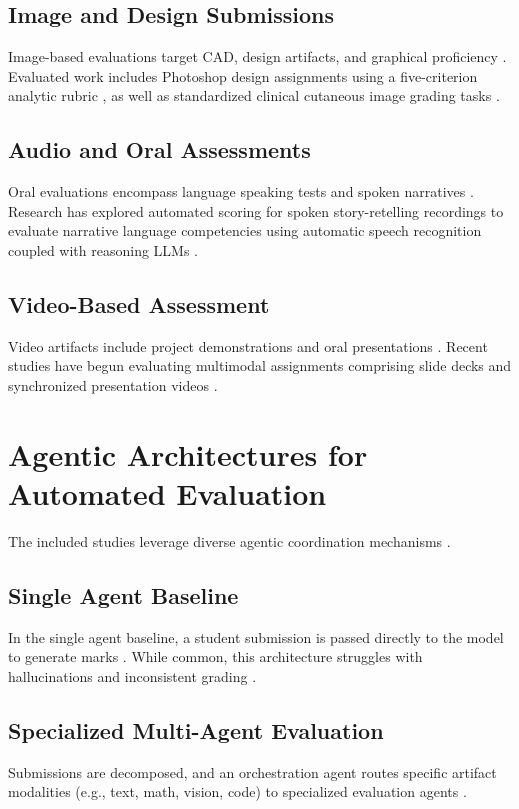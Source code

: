 \documentclass[11pt,a4paper]{article}
\begin{document}
\subsection{Image and Design Submissions}
Image-based evaluations target CAD, design artifacts, and graphical proficiency \cite{P006, P014}. Evaluated work includes Photoshop design assignments using a five-criterion analytic rubric \cite{P014}, as well as standardized clinical cutaneous image grading tasks \cite{P006}.

\subsection{Audio and Oral Assessments}
Oral evaluations encompass language speaking tests and spoken narratives \cite{P029}. Research has explored automated scoring for spoken story-retelling recordings to evaluate narrative language competencies using automatic speech recognition coupled with reasoning LLMs \cite{P029}.

\subsection{Video-Based Assessment}
Video artifacts include project demonstrations and oral presentations \cite{P020}. Recent studies have begun evaluating multimodal assignments comprising slide decks and synchronized presentation videos \cite{P020}.

\section{Agentic Architectures for Automated Evaluation}
The included studies leverage diverse agentic coordination mechanisms \cite{P002, P008, P021, P027}.

\subsection{Single Agent Baseline}
In the single agent baseline, a student submission is passed directly to the model to generate marks \cite{P001, P003}. While common, this architecture struggles with hallucinations and inconsistent grading \cite{P003, P028}.

\subsection{Specialized Multi-Agent Evaluation}
Submissions are decomposed, and an orchestration agent routes specific artifact modalities (e.g., text, math, vision, code) to specialized evaluation agents \cite{P021}. 
\end{document}
